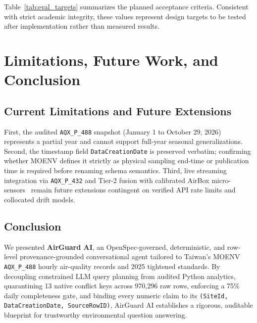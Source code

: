 \documentclass[conference]{IEEEtran}
\begin{document}
Table~\ref{tab:eval_targets} summarizes the planned acceptance criteria. Consistent with strict academic integrity, these values represent design targets to be tested after implementation rather than measured results.

\section{Limitations, Future Work, and Conclusion}
\subsection{Current Limitations and Future Extensions}
First, the audited \texttt{AQX\_P\_488} snapshot (January 1 to October 29, 2026) represents a partial year and cannot support full-year seasonal generalizations. Second, the timestamp field \texttt{DataCreationDate} is preserved verbatim; confirming whether MOENV defines it strictly as physical sampling end-time or publication time is required before renaming schema semantics. Third, live streaming integration via \texttt{AQX\_P\_432} and Tier-2 fusion with calibrated AirBox micro-sensors~\cite{tzeng2023airbox,dong2025calibration,fang2025deployment,lekamge2025rh} remain future extensions contingent on verified API rate limits and collocated drift models.

\subsection{Conclusion}
We presented \textbf{AirGuard AI}, an OpenSpec-governed, deterministic, and row-level provenance-grounded conversational agent tailored to Taiwan's MOENV \texttt{AQX\_P\_488} hourly air-quality records and 2025 tightened standards. By decoupling constrained LLM query planning from audited Python analytics, quarantining 13 native conflict keys across 970,296 raw rows, enforcing a 75\% daily completeness gate, and binding every numeric claim to its \texttt{(SiteId, DataCreationDate, SourceRowID)}, AirGuard AI establishes a rigorous, auditable blueprint for trustworthy environmental question answering.



\end{document}
